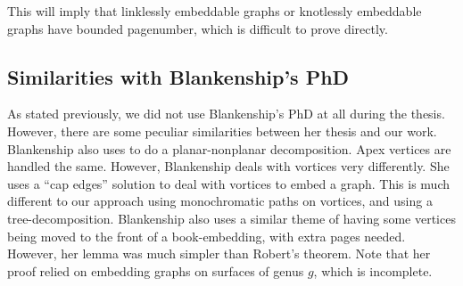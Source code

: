 This will imply that linklessly embeddable graphs or knotlessly embeddable graphs have bounded pagenumber, which is difficult to prove directly. 

\subsection{Similarities with Blankenship's PhD}
As stated previously, we did not use Blankenship's PhD at all during the thesis. However, there are some peculiar similarities between her thesis and our work. 
Blankenship also uses \textcite{heathPagenumberGenusGraphs1992} to do a planar-nonplanar decomposition. Apex vertices are handled the same. However, Blankenship deals with vortices very differently. She uses a ``cap edges'' solution to deal with vortices to embed a graph. This is much different to our approach using monochromatic paths on vortices, and using a tree-decomposition. 
Blankenship also uses a similar theme of having some vertices being moved to the front of a book-embedding, with extra pages needed. However, her lemma was much simpler than Robert's theorem. Note that her proof relied on \textcite{heathPagenumberGenusGraphs1992} embedding graphs on surfaces of genus $g$, which is incomplete.